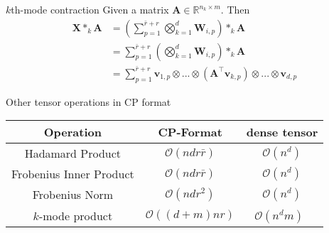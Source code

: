 \documentclass{beamer}
\newcommand{\bvec}[1]{\mathbf{#1}}
\newcommand{\vv}{\bvec{v}}
\newcommand{\vA}{\bvec{A}}
\newcommand{\vW}{\bvec{W}}
\newcommand{\vX}{\bvec{X}}
\begin{document}
\begin{frame}{$k$th-mode contraction}
Given a matrix $\vA\in\mathbb{R}^{n_k \times m}$. 
Then
\begin{equation*}
\begin{aligned}
\vX *_{k} \vA
&=
\left( 
\sum_{p=1}^{\bar{r} + r} \bigotimes_{k=1}^d
\vW_{i,p} \right) *_{k} \vA\\
&=
\sum_{p=1}^{\bar{r} + r} \left( \bigotimes_{k=1}^d
\vW_{i,p} \right) *_{k} \vA\\
&=
\sum_{p=1}^{\bar{r} + r} 
\vv_{1,p} \otimes ... \otimes \left(\vA^\top \vv_{k,p}\right) \otimes ...\otimes \vv_{d,p}
\end{aligned}
\end{equation*}
    
\end{frame}

\begin{frame}{Other tensor operations in CP format}
\begin{table}[]
    \centering
    \begin{tabular}{c|cc}
	Operation & CP-Format & dense tensor\\
        \hline
         Hadamard Product & $\mathcal{O}(ndr\bar{r})$ & $\mathcal{O}(n^d)$\\
         Frobenius Inner Product & $\mathcal{O}(ndr\bar{r})$ & $\mathcal{O}(n^d)$\\ 
	 Frobenius Norm & $\mathcal{O}(ndr^2)$ & $\mathcal{O}(n^d)$\\
	 $k$-mode product & $\mathcal{O}((d+m)nr)$ & $\mathcal{O}(n^dm)$\
    \end{tabular}
\end{table}

\end{frame}
\end{document}
